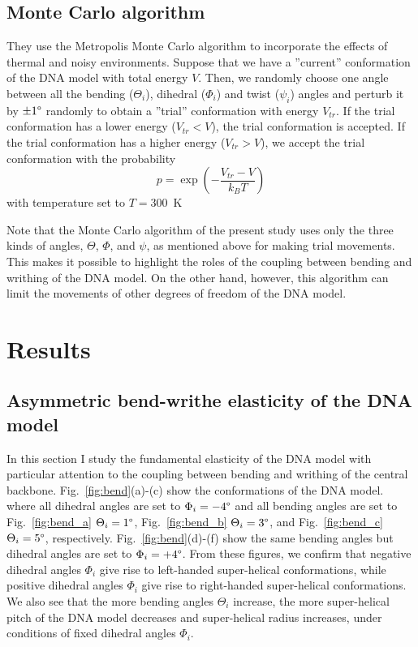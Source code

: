 \documentclass[a4paper,10pt]{article}
\begin{document}
\subsection{Monte Carlo algorithm}
They use the Metropolis Monte Carlo algorithm to incorporate the effects of thermal and noisy environments.
Suppose that we have a ''current'' conformation of the DNA model with total energy $V$.
Then, we randomly choose one angle between all the bending ($\Theta_i$), dihedral ($\Phi_i$) and twist ($\psi_i$) angles and perturb it by $\pm1\degree$ randomly to obtain a ''trial'' conformation with energy $V_{tr}$.
If the trial conformation has a lower energy ($V_{tr}<V$), the trial conformation is accepted.
If the trial conformation has a higher energy ($V_{tr}>V$), we accept the trial conformation with the probability
\begin{equation}\label{eq:prob}
p=\exp{\left(-\dfrac{V_{tr}-V}{k_{B}T}\right)}
\end{equation}
with temperature set to $T=$\SI{300}{\kelvin}

Note that the Monte Carlo algorithm of the present study uses only the three kinds of angles, $\Theta$, $\Phi$, and $\psi$, as mentioned above for making trial movements.
This makes it possible to highlight the roles of the coupling between bending and writhing of the DNA model.
On the other hand, however, this algorithm can limit the movements of other degrees of freedom of the DNA model.

\section{Results}
\subsection{Asymmetric bend-writhe elasticity of the DNA model}\label{sec:bend_writh}
In this section I study the fundamental elasticity of the DNA model with particular attention to the coupling between bending and writhing of the central backbone.
Fig.~\ref{fig:bend}(a)-(c) show the conformations of the DNA model. where all dihedral angles are set to $\Phi_i=-4\degree$ and all bending angles are set to Fig.~\ref{fig:bend_a} $\Theta_i=1\degree$, Fig.~\ref{fig:bend_b} $\Theta_i=3\degree$, and Fig.~\ref{fig:bend_c} $\Theta_i=5\degree$, respectively.
Fig.~\ref{fig:bend}(d)-(f) show the same bending angles but dihedral angles are set to $\Phi_i=+4\degree$.
From these figures, we confirm that negative dihedral angles $\Phi_i$ give rise to left-handed super-helical conformations, while positive dihedral angles $\Phi_i$ give rise to right-handed super-helical conformations.
We also see that the more bending angles $\Theta_i$ increase, the more super-helical pitch of the DNA model decreases and super-helical radius increases, under conditions of fixed dihedral angles $\Phi_i$.
\end{document}
